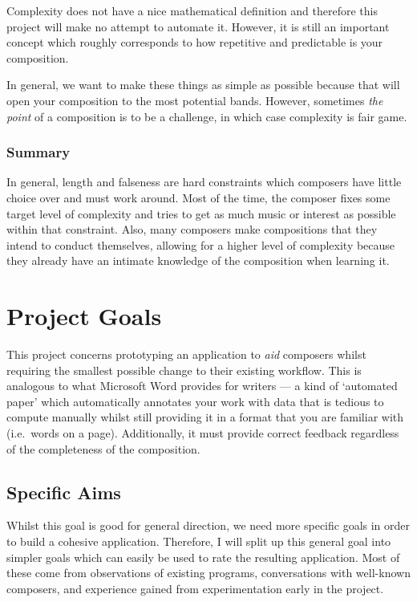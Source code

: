 \documentclass[12pt]{article}
\begin{document}
Complexity does not have a nice mathematical definition and therefore this project will make no
attempt to automate it.  However, it is still an important concept which roughly corresponds to how
repetitive and predictable is your composition.

In general, we want to make these things as simple as possible because that will open your
composition to the most potential bands.  However, sometimes \emph{the point} of a composition is to
be a challenge, in which case complexity is fair game.

\subsubsection{Summary}

In general, length and falseness are hard constraints which composers have little choice over and
must work around.  Most of the time, the composer fixes some target level of complexity and tries
to get as much music or interest as possible within that constraint.  Also, many composers make
compositions that they intend to conduct themselves, allowing for a higher level of complexity
because they already have an intimate knowledge of the composition when learning it.



\pagebreak

\section{Project Goals}

This project concerns prototyping an application to \emph{aid} composers whilst requiring the
smallest possible change to their existing workflow.  This is analogous to what Microsoft Word
provides for writers --- a kind of `automated paper' which automatically annotates your work with
data that is tedious to compute manually whilst still providing it in a format that you are familiar
with (i.e.\ words on a page).  Additionally, it must provide correct feedback regardless of the
completeness of the composition.

\subsection{Specific Aims}

Whilst this goal is good for general direction, we need more specific goals in order to build a
cohesive application.  Therefore, I will split up this general goal into simpler goals which can
easily be used to rate the resulting application.  Most of these come from observations of existing
programs, conversations with well-known composers, and experience gained from experimentation early
in the project.
\end{document}
